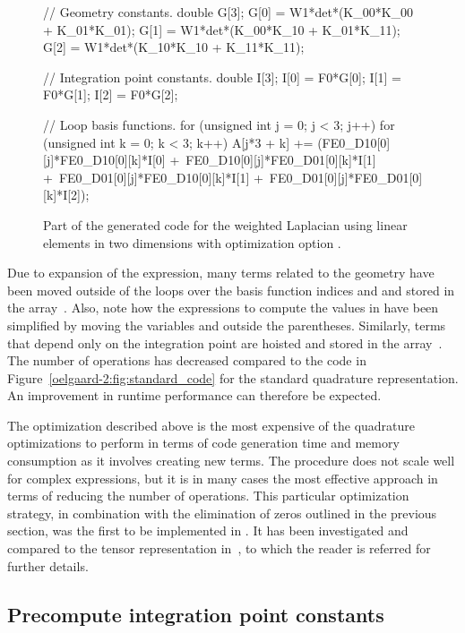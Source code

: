 \begin{figure}
\begin{c++}
// Geometry constants.
double G[3];
G[0] = W1*det*(K_00*K_00 + K_01*K_01);
G[1] = W1*det*(K_00*K_10 + K_01*K_11);
G[2] = W1*det*(K_10*K_10 + K_11*K_11);

// Integration point constants.
double I[3];
I[0] = F0*G[0];
I[1] = F0*G[1];
I[2] = F0*G[2];

// Loop basis functions.
for (unsigned int j = 0; j < 3; j++)
{
 for (unsigned int k = 0; k < 3; k++)
 {
  A[j*3 + k] += (FE0_D10[0][j]*FE0_D10[0][k]*I[0] +\
                 FE0_D10[0][j]*FE0_D01[0][k]*I[1] +\
                 FE0_D01[0][j]*FE0_D10[0][k]*I[1] +\
                 FE0_D01[0][j]*FE0_D01[0][k]*I[2]);
 }
}
\end{c++}
\caption{Part of the generated code for the weighted Laplacian using
  linear elements in two dimensions with optimization option .}
\label{oelgaard-2:fig:O_simplify_code}
\end{figure}

Due to expansion of the expression, many terms related to the geometry
have been moved outside of the loops over the basis function indices
 and  and stored in the array~.  Also, note how
the expressions to compute the values in \emp{G} have been simplified
by moving the variables \emp{det} and \emp{W1} outside the
parentheses.  Similarly, terms that depend only on the integration
point are hoisted and stored in the array~\emp{I}.  The number of
operations has decreased compared to the code in
Figure~\ref{oelgaard-2:fig:standard_code} for the standard quadrature
representation. An improvement in runtime performance can therefore be
expected.

The optimization described above is the most expensive of the
quadrature optimizations to perform in terms of \ffc{} code generation
time and memory consumption as it involves creating new terms.  The
procedure does not scale well for complex expressions, but it is in
many cases the most effective approach in terms of reducing the number
of operations.  This particular optimization strategy, in combination
with the elimination of zeros outlined in the previous section, was
the first to be implemented in \ffc{}.  It has been investigated and
compared to the tensor representation in~\citet{OelgaardWells2010}, to
which the reader is referred for further details.

\subsection{Precompute integration point constants}

